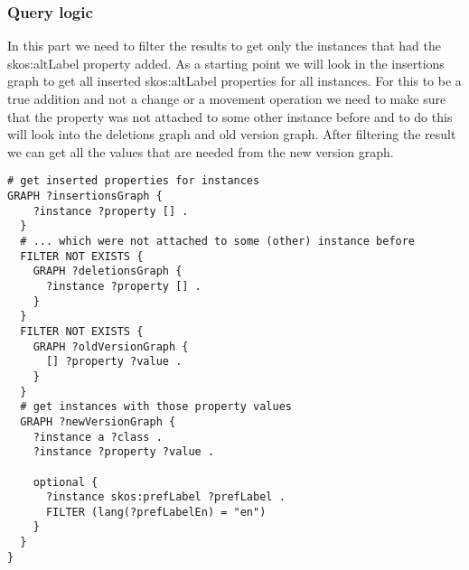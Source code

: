 \subsubsection{Query logic}
In this part we need to filter the results to get only the instances that had the skos:altLabel property added. As a starting point we will look in the insertions graph to get all inserted skos:altLabel properties for all instances. For this to be a true addition and not a change or a movement operation we need to make sure that the property was not attached to some other instance before and to do this will look into the deletions graph and old version graph. After filtering the result we can get all the values that are needed from the new version graph.

\begin{lstlisting}
# get inserted properties for instances
GRAPH ?insertionsGraph {
    ?instance ?property [] .
  }
  # ... which were not attached to some (other) instance before
  FILTER NOT EXISTS {
    GRAPH ?deletionsGraph {
      ?instance ?property [] .
    }
  }
  FILTER NOT EXISTS {
    GRAPH ?oldVersionGraph {
      [] ?property ?value .
    }
  }
  # get instances with those property values
  GRAPH ?newVersionGraph {
    ?instance a ?class .
    ?instance ?property ?value .

    optional {
      ?instance skos:prefLabel ?prefLabel .
      FILTER (lang(?prefLabelEn) = "en")
    }
  }
}
\end{lstlisting}
